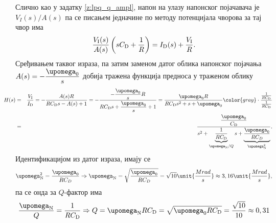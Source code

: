 Слично као у задатку \ref{z:lpq_q_ampl}, напон на улазу напонског појачавача је  $V_I(s)/A(s)$ па се писањем 
једначине по методу потенцијала чворова за тај чвор има 
\begin{equation}
    \dfrac{V_{\rm I}(s)}{A(s)} \left( sC_{\rm D} + \dfrac{1}{R} \right) = I_{\rm D}(s) + \dfrac{V_{\rm I}}{R}. 
\end{equation}
Сређивањем таквог израза, па затим заменом датог облика напонског појачања
$A(s) = -\dfrac{\upomega_{\rm 0}}{s}$ добија тражена функција предноса у траженом облику
\begin{eqnarray}
    \hspace*{-10mm}
    H(s)  &=&
    \dfrac{V_{\rm I}}{I_{\rm D}} =  -\dfrac{A(s) R}{RC_{\rm D} s - A(s) + 1 }
    =
    -\dfrac{-\dfrac{\upomega_0}{s} R}{RC_{\rm D} s + \dfrac{\upomega_0}{s} + 1 }
    =
    \dfrac{ \upomega_0 R}{RC_{\rm D} s^2 + s + \upomega_0 }
    {\color{gray}
    \cdot
    \dfrac{\tfrac{1}{R C_{\rm D}}}{\tfrac{1}{R C_{\rm D}}}
    }
    \\
    &=&
    \dfrac{ \dfrac{\upomega_0}{C_{\rm D}} }{s^2 + 
    \underbrace{\dfrac{1}{R C_{\rm D}}}_{\upomega_{\rm N}/Q} s + 
    \underbrace{\dfrac{\upomega_{\rm 0}}{{R C_{D}}}}_{\upomega_{\rm N}^2}}.
\end{eqnarray}
Идентификацијом из датог израза, имају се 
\begin{eqnarray}
    \upomega_{\rm N}^2 = \dfrac{\upomega_{\rm 0}}{{R C_{D}}} 
    \Rightarrow
    \upomega_{\rm N} = \sqrt{ \dfrac{\upomega_{\rm 0}}{{R C_{D}}} } = \sqrt{10} \unit{\dfrac{Mrad}{s}}
    \approx
    3,16\unit{\dfrac{Mrad}{s}}, \\
\end{eqnarray}
па се онда за $Q$-фактор има 
\begin{equation}
    \dfrac{\upomega_{\rm N}}{Q} = \dfrac{1}{R C_{\rm D}} \Rightarrow
    Q = \upomega_{\rm N} R C_{\rm D} = \sqrt{\upomega_{\rm 0} R C_{\rm D}} 
    = \dfrac{\sqrt{10}}{10} \approx 0,31 
\end{equation}


